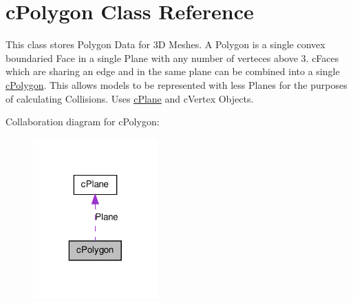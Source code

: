 \hypertarget{classc_polygon}{
\section{cPolygon Class Reference}
\label{classc_polygon}
}


This class stores Polygon Data for 3D Meshes. A Polygon is a single convex boundaried Face in a single Plane with any number of verteces above 3. cFaces which are sharing an edge and in the same plane can be combined into a single \hyperlink{classc_polygon}{cPolygon}. This allows models to be represented with less Planes for the purposes of calculating Collisions. Uses \hyperlink{classc_plane}{cPlane} and cVertex Objects.  




Collaboration diagram for cPolygon:\nopagebreak
\begin{figure}[H]
\begin{center}
\leavevmode
\includegraphics[width=136pt]{classc_polygon__coll__graph}
\end{center}
\end{figure}
